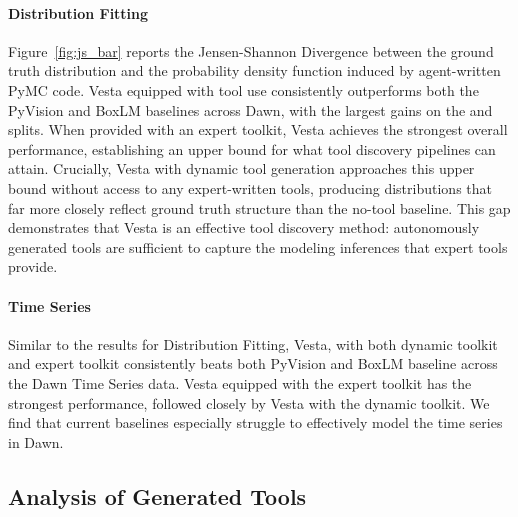 \documentclass{article}
\newcommand{\method}{{\sc Vesta}}
\newcommand{\data}{{\sc Dawn}}
\newcommand{\splitlabel}[3]{%
  \tikz[baseline=-0.6ex]{%
    \node[
      rounded corners=3pt,
      fill=#2,
      draw=#1,
      line width=0.8pt,
      inner xsep=4pt,
      inner ysep=2pt,
      font=\bfseries\small
    ] {#3};%
  }%
}
\newcommand{\Hard}{\splitlabel{hardred}{hardfill}{Hard}}
\newcommand{\Astro}{\splitlabel{astroblue}{astrofill}{Astro}}
\begin{document}
\paragraph{Distribution Fitting} Figure~\ref{fig:js_bar} reports the Jensen-Shannon Divergence between the ground truth distribution and the probability density function induced by agent-written PyMC code. \method{} equipped with tool use consistently outperforms both the PyVision and BoxLM baselines across \data{}, with the largest gains on the \protect\Hard{} and \protect\Astro{} splits. When provided with an expert toolkit, \method{} achieves the strongest overall performance, establishing an upper bound for what tool discovery pipelines can attain. Crucially, \method{} with dynamic tool generation approaches this upper bound without access to any expert-written tools, producing distributions that far more closely reflect ground truth structure than the no-tool baseline. This gap demonstrates that \method{} is an effective tool discovery method: autonomously generated tools are sufficient to capture the modeling inferences that expert tools provide.

\vspace{-0.3em}
\paragraph{Time Series} Similar to the results for Distribution Fitting, \method{}, with both dynamic toolkit and expert toolkit consistently beats both PyVision and BoxLM baseline across the \data{} Time Series data. \method{} equipped with the expert toolkit has the strongest performance, followed closely by \method{} with the dynamic toolkit. We find that current baselines especially struggle to effectively model the time series in \data{}. 


\subsection{Analysis of Generated Tools}
\label{sec:tools}
\vspace{-0.3em}
\end{document}
